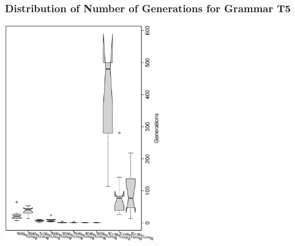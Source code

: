  \begin{frame}
 \frametitle{ Distribution of Number of Generations for Grammar T5 }
 \begin{center}
\includegraphics[width=0.5\textwidth, angle=-90]
{ExpFboxplottGenerations011.eps}
 \end{center}
 \label{ExpFboxplottGenerations011.eps}  
 \end{frame}

